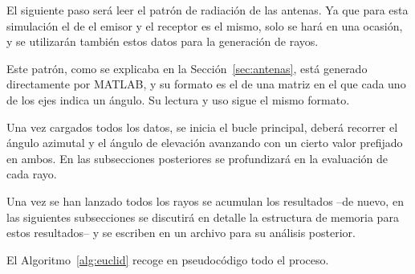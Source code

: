 El siguiente paso será leer el patrón de radiación de las antenas.
Ya que para esta simulación el de el emisor y el receptor es el mismo, solo se hará en una ocasión, y se utilizarán también estos datos para la generación de rayos.

Este patrón, como se explicaba en la Sección~\ref{sec:antenas}, está generado directamente por MATLAB, y su formato es el de una matriz en el que cada uno de los ejes indica un ángulo.
Su lectura y uso sigue el mismo formato.

Una vez cargados todos los datos, se inicia el bucle principal, deberá recorrer el ángulo azimutal y el ángulo de elevación avanzando con un cierto valor prefijado en ambos.
En las subsecciones posteriores se profundizará en la evaluación de cada rayo.

Una vez se han lanzado todos los rayos se acumulan los resultados --de nuevo, en las siguientes subsecciones se discutirá en detalle la estructura de memoria para estos resultados-- y se escriben en un archivo para su análisis posterior.

El Algoritmo~\ref{alg:euclid} recoge en pseudocódigo todo el proceso.







